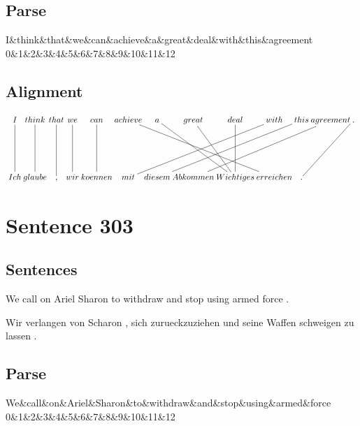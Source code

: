 \documentclass{report}
\begin{document}
\subsection*{Parse}
\begin{dependency}[theme=simple]
\begin{deptext}[column sep=.5cm, row sep=.1ex]
I\&think\&that\&we\&can\&achieve\&a\&great\&deal\&with\&this\&agreement\\
0\&1\&2\&3\&4\&5\&6\&7\&8\&9\&10\&11\&12\\
\end{deptext}
\end{dependency}


\subsection*{Alignment}
\scriptsize{
$
\xymatrix@C-2.3pc{
I \ar @{-} [dd] & think \ar @{-} [dd] & that \ar @{-} [dd] & we \ar @{-} [dd] & can \ar @{-} [dd] & achieve \ar @{-} [ddrrrr] & a \ar @{-} [ddrr] & great \ar @{-} [ddr] & deal \ar @{-} [dd] & with \ar @{-} [ddllll] & this \ar @{-} [ddllll] & agreement \ar @{-} [ddllll] & . \ar @{-} [ddll]\\\\
Ich & glaube & , & wir & koennen & mit & diesem & Abkommen & Wichtiges & erreichen & .
}$}
\newpage\section*{Sentence 303}

\subsection*{Sentences}
We call on Ariel Sharon to withdraw and stop using armed force .

\noindent Wir verlangen von Scharon , sich zurueckzuziehen und seine Waffen schweigen zu lassen .



\subsection*{Parse}
\begin{dependency}[theme=simple]
\begin{deptext}[column sep=.5cm, row sep=.1ex]
We\&call\&on\&Ariel\&Sharon\&to\&withdraw\&and\&stop\&using\&armed\&force\\
0\&1\&2\&3\&4\&5\&6\&7\&8\&9\&10\&11\&12\\
\end{deptext}
\end{dependency}
\end{document}
